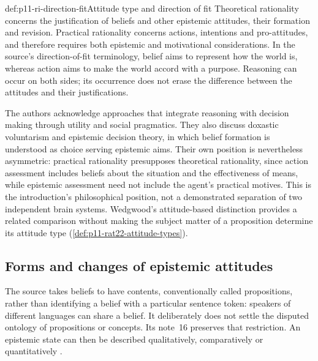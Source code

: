 \begin{hbdefinition}{def:p11-ri-direction-fit}{Attitude type and direction of fit}
Theoretical rationality concerns the justification of beliefs and other
epistemic attitudes, their formation and revision. Practical rationality
concerns actions, intentions and pro-attitudes, and therefore requires
both epistemic and motivational considerations. In the source's
direction-of-fit terminology, belief aims to represent how the world
is, whereas action aims to make the world accord with a purpose.
Reasoning can occur on both sides; its occurrence does not erase the
difference between the attitudes and their justifications.
\end{hbdefinition}

The authors acknowledge approaches that integrate reasoning with
decision making through utility and social pragmatics. They also discuss
doxastic voluntarism and epistemic decision theory, in which belief
formation is understood as choice serving epistemic aims. Their own
position is nevertheless asymmetric: practical rationality presupposes
theoretical rationality, since action assessment includes beliefs about
the situation and the effectiveness of means, while epistemic assessment
need not include the agent's practical motives. This is the introduction's
philosophical position, not a demonstrated separation of two independent
brain systems. Wedgwood's attitude-based distinction provides a related
comparison without making the subject matter of a proposition determine
its attitude type (\cref{def:p11-rat22-attitude-types}).

\subsection{Forms and changes of epistemic attitudes}

The source takes beliefs to have contents, conventionally called
propositions, rather than identifying a belief with a particular sentence
token: speakers of different languages can share a belief. It deliberately
does not settle the disputed ontology of propositions or concepts.
Its note~16 preserves that restriction. An epistemic state can then be
described qualitatively, comparatively or quantitatively
\cite[pp.~11--14 and notes~16--18]{KnauffSpohn2021FrameworksIntro}.

